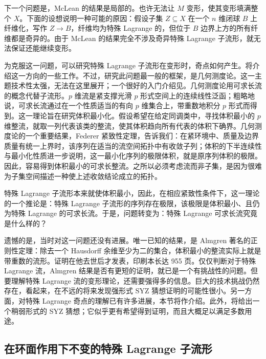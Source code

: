 下一个问题是，McLean 的结果是局部的。也许无法让 $M$ 变形，使其变形填满整个 $X$。下面的设想说明一种可能的原因：假设子集 $Z\subseteq X$ 在一个 $n$ 维闭球 $B$ 上纤维化，写作 $Z\to B$，纤维均为特殊 Lagrange 的，但位于 $B$ 边界上方的所有纤维都是奇异的。由于 McLean 的结果完全不涉及奇异特殊 Lagrange 子流形，就无法保证还能继续变形。

为克服这一问题，可以研究特殊 Lagrange 子流形在变形时，奇点如何产生。将介绍这一方向的一些工作。不过，研究此问题最一般的框架，是几何测度论。这一主题技术性太强，无法在这里展开；一个很好的入门介绍见。几何测度论用可求长流的概念代替子流形。$p$ 维流是紧支撑光滑 $p$ 形式空间上的连续线性泛函；粗略地说，可求长流通过在一个性质适当的有向 $p$ 维集合上，带重数地积分 $p$ 形式而得到。这一理论旨在研究体积最小化。假设希望在给定同调类中，寻找体积最小的 $p$ 维整流，就取一列代表该类的整流，使其体积趋向所有代表的体积下确界。几何测度论的一个重要结果，Federer 紧致性定理，告诉我们：在紧环境中、质量及边界质量有统一上界时，该序列在适当的流空间拓扑中有收敛子列；体积的下半连续性与最小化性质进一步说明，这一最小化序列的极限体积，就是原序列体积的极限。因此，容易得到体积最小的可求长整流。之所以必须考虑流而非子集，是因为很难为子集空间描述一种使上述收敛结论成立的拓扑。

特殊 Lagrange 子流形本来就使体积最小，因此，在相应紧致性条件下，这一理论的一个推论是：特殊 Lagrange 子流形的序列存在极限，该极限是体积最小、且仍为特殊 Lagrange 的可求长流。于是，问题转变为：特殊 Lagrange 可求长流究竟是什么样的？

遗憾的是，当时对这一问题还没有进展。唯一已知的结果，是 Almgren 著名的正则性定理：除去一个 Hausdorff 余维至少为二的集合，体积最小的整流实际上就是带重数的流形。证明在他去世后才发表，印刷本长达 955 页。仅仅判断对于特殊 Lagrange 流，Almgren 结果是否有更短的证明，就已是一个有挑战性的问题。但要理解特殊 Lagrange 流的变形理论，还需要强得多的信息。巨大的技术挑战仍然存在，看起来，在不远的将来发现强形式 SYZ 猜想证明的可能性很小。另一方面，对特殊 Lagrange 奇点的理解已有许多进展，本节将作介绍。此外，将给出一个稍弱形式的 SYZ 猜想；它似乎更有希望得到证明，而且大概足以满足多数用途。

\subsection{在环面作用下不变的特殊 Lagrange 子流形}\label{sec:7.2.2}

